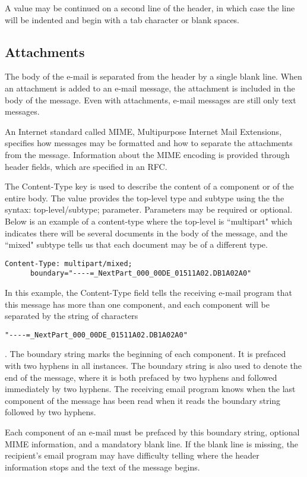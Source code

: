 A value may be continued on a second line of the header, in which
case the line will be indented and begin with a tab character or
blank spaces.

\subsection*{Attachments}

The body of the e-mail is separated from the header by a single
blank line. 
When an attachment is added to an e-mail message, the attachment
is included in the body of the message. 
Even with attachments, e-mail messages are still only
text messages. 

An Internet standard called MIME, 
Multipurpose Internet Mail Extensions, 
specifies how messages may be formatted and how to separate 
the attachments from the message. 
Information about the MIME encoding is provided through header fields, 
which are specified in an RFC. 

The Content-Type key is used to describe the content of a component
or of the entire body. 
The value provides the top-level type and subtype using the 
the syntax:  top-level/subtype; parameter.
Parameters may be required or optional.
Below is an example of a content-type where the 
top-level is ``multipart" which indicates there will be several 
documents in the body of the message, and the ``mixed" subtype  tells
us that each document may be of a different type.

\begin{verbatim}
Content-Type: multipart/mixed;
      boundary="----=_NextPart_000_00DE_01511A02.DB1A02A0"
\end{verbatim}

In this example, the Content-Type field tells the receiving e-mail program 
that this message has more than one component, and each component will be 
separated by the string of characters 
\begin{verbatim}"----=_NextPart_000_00DE_01511A02.DB1A02A0"\end{verbatim}.
The boundary string marks the beginning of each component.
It is prefaced with two hyphens in all instances.
The boundary string is also used to denote the end of the message, 
where it is both prefaced by two hyphens and followed immediately by two 
hyphens. 
The receiving email program knows when the last component of the message
has been read when it reads the boundary string followed by two hyphens.

Each component of an e-mail must be prefaced by this 
boundary string, optional MIME information, and a mandatory blank line. 
If the blank line is missing, the recipient's email program may have 
difficulty telling where the header information stops and the text of the 
message begins.

